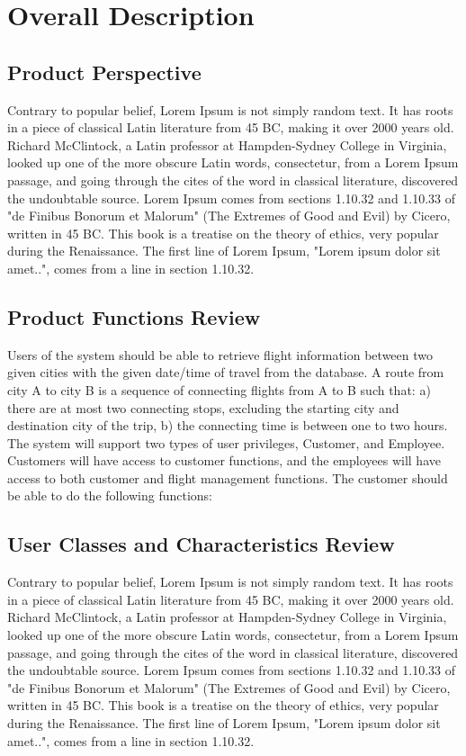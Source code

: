 \documentclass{scrreprt}
\begin{document}
    \chapter{Overall Description} 
    \section{Product Perspective}
    Contrary to popular belief, Lorem Ipsum is not simply random text. It has roots in a piece of classical Latin literature from 45 BC, making it over 2000 years old. Richard McClintock, a Latin professor at Hampden-Sydney College in Virginia, looked up one of the more obscure Latin words, consectetur, from a Lorem Ipsum passage, and going through the cites of the word in classical literature, discovered the undoubtable source. Lorem Ipsum comes from sections 1.10.32 and 1.10.33 of "de Finibus Bonorum et Malorum" (The Extremes of Good and Evil) by Cicero, written in 45 BC. This book is a treatise on the theory of ethics, very popular during the Renaissance. The first line of Lorem Ipsum, "Lorem ipsum dolor sit amet..", comes from a line in section 1.10.32.
    \section{Product Functions Review}
    Users of the system should be able to retrieve flight information between two given cities with the given date/time of travel from the database. A route from city A to city B is a sequence of connecting flights from A to B such that: a) there are at most two connecting stops, excluding the starting city and destination city of the trip, b) the connecting time is between one to two hours. The system will support two types of user privileges, Customer, and Employee. Customers will have access to customer functions, and the employees will have access to both customer and flight management functions. The customer should be able to do the following functions:
    \section{User Classes and Characteristics Review}
    Contrary to popular belief, Lorem Ipsum is not simply random text. It has roots in a piece of classical Latin literature from 45 BC, making it over 2000 years old. Richard McClintock, a Latin professor at Hampden-Sydney College in Virginia, looked up one of the more obscure Latin words, consectetur, from a Lorem Ipsum passage, and going through the cites of the word in classical literature, discovered the undoubtable source. Lorem Ipsum comes from sections 1.10.32 and 1.10.33 of "de Finibus Bonorum et Malorum" (The Extremes of Good and Evil) by Cicero, written in 45 BC. This book is a treatise on the theory of ethics, very popular during the Renaissance. The first line of Lorem Ipsum, "Lorem ipsum dolor sit amet..", comes from a line in section 1.10.32.
\end{document}
